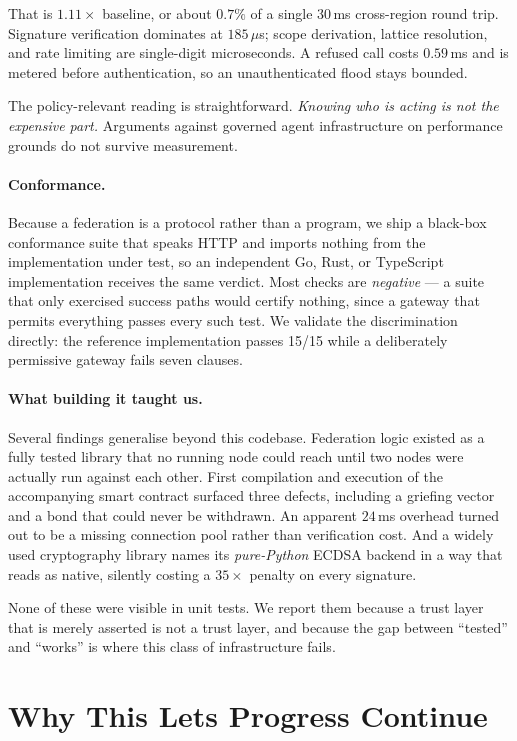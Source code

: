 \documentclass[11pt]{article}
\begin{document}
That is $1.11\times$ baseline, or about $0.7\%$ of a single $30$\,ms cross-region
round trip. Signature verification dominates at $185\,\mu$s; scope derivation,
lattice resolution, and rate limiting are single-digit microseconds. A refused
call costs $0.59$\,ms and is metered before authentication, so an unauthenticated
flood stays bounded.

The policy-relevant reading is straightforward. \emph{Knowing who is acting is
not the expensive part.} Arguments against governed agent infrastructure on
performance grounds do not survive measurement.

\paragraph{Conformance.} Because a federation is a protocol rather than a
program, we ship a black-box conformance suite that speaks HTTP and imports
nothing from the implementation under test, so an independent Go, Rust, or
TypeScript implementation receives the same verdict. Most checks are
\emph{negative} --- a suite that only exercised success paths would certify
nothing, since a gateway that permits everything passes every such test. We
validate the discrimination directly: the reference implementation passes 15/15
while a deliberately permissive gateway fails seven clauses.

\paragraph{What building it taught us.} Several findings generalise beyond this
codebase. Federation logic existed as a fully tested library that no running node
could reach until two nodes were actually run against each other. First
compilation and execution of the accompanying smart contract surfaced three
defects, including a griefing vector and a bond that could never be withdrawn.
An apparent $24$\,ms overhead turned out to be a missing connection pool rather
than verification cost. And a widely used cryptography library names its
\emph{pure-Python} ECDSA backend in a way that reads as native, silently costing
a $35\times$ penalty on every signature.

None of these were visible in unit tests. We report them because a trust layer
that is merely asserted is not a trust layer, and because the gap between
``tested'' and ``works'' is where this class of infrastructure fails.

\section{Why This Lets Progress Continue}
\end{document}
